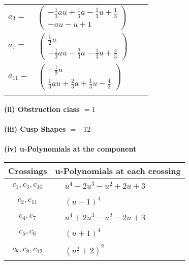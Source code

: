 \documentclass[1p]{elsarticle_modified}
\theoremstyle{definition}
\begin{document}
\begin{tabular}{m{7pt} m{180pt} m{7pt} m{180pt} }
\flushright $a_{3}=$&$\begin{pmatrix}-\frac{1}{3} a u+\frac{1}{3} a-\frac{1}{3} u+\frac{1}{3}\\- a u- u+1\end{pmatrix}$ \\
\flushright $a_{7}=$&$\begin{pmatrix}\frac{1}{2} u\\-\frac{1}{3} a u-\frac{2}{3} a-\frac{1}{3} u+\frac{4}{3}\end{pmatrix}$ \\
\flushright $a_{11}=$&$\begin{pmatrix}-\frac{1}{2} u\\\frac{1}{3} a u+\frac{2}{3} a+\frac{1}{3} u-\frac{4}{3}\end{pmatrix}$\\&\end{tabular}
\flushleft \textbf{(ii) Obstruction class $= 1$}\\~\\
\flushleft \textbf{(iii) Cusp Shapes $= -12$}\\~\\
\newpage\renewcommand{\arraystretch}{1}
\flushleft \textbf{(iv) u-Polynomials at the component}\newline \\
\begin{tabular}{m{50pt}|m{274pt}}
Crossings & \hspace{64pt}u-Polynomials at each crossing \\
\hline $$\begin{aligned}c_{1},c_{3},c_{10}\end{aligned}$$&$\begin{aligned}
&u^4-2 u^3- u^2+2 u+3
\end{aligned}$\\
\hline $$\begin{aligned}c_{2},c_{11}\end{aligned}$$&$\begin{aligned}
&(u-1)^4
\end{aligned}$\\
\hline $$\begin{aligned}c_{4},c_{7}\end{aligned}$$&$\begin{aligned}
&u^4+2 u^3- u^2-2 u+3
\end{aligned}$\\
\hline $$\begin{aligned}c_{5},c_{6}\end{aligned}$$&$\begin{aligned}
&(u+1)^4
\end{aligned}$\\
\hline $$\begin{aligned}c_{8},c_{9},c_{12}\end{aligned}$$&$\begin{aligned}
&(u^2+2)^2
\end{aligned}$\\
\hline
\end{tabular}\\~\\
\end{document}

